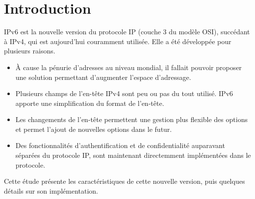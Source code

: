 \section{Introduction}

IPv6 est la nouvelle version du protocole IP (couche 3 du modèle OSI), succédant à IPv4, qui est aujourd'hui couramment utilisée.
Elle a été développée pour plusieurs raisons.
\begin{itemize}
  \item À cause la pénurie d’adresses au niveau mondial, il fallait pouvoir proposer une solution permettant d'augmenter l'espace d'adressage.
  \item Plusieurs champs de l'en-tête IPv4 sont peu ou pas du tout utilisé. IPv6 apporte une simplification du format de l'en-tête.
  \item Les changements de l'en-tête permettent une gestion plus flexible des options et permet l'ajout de nouvelles options dans le futur.
  \item Des fonctionnalités d'authentification et de confidentialité auparavant séparées du protocole IP, sont maintenant directemment implémentées dans le protocole.
\end{itemize}
  
Cette étude présente les caractéristiques de cette nouvelle version, puis quelques détails sur son implémentation.
  

